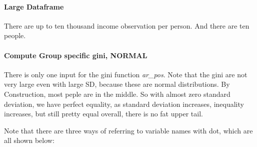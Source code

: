 \documentclass[
]{book}
\newenvironment{Shaded}{\begin{snugshade}}{\end{snugshade}}
\newcommand{\CommentTok}[1]{\textcolor[rgb]{0.56,0.35,0.01}{\textit{#1}}}
\newcommand{\DataTypeTok}[1]{\textcolor[rgb]{0.13,0.29,0.53}{#1}}
\newcommand{\DecValTok}[1]{\textcolor[rgb]{0.00,0.00,0.81}{#1}}
\newcommand{\FloatTok}[1]{\textcolor[rgb]{0.00,0.00,0.81}{#1}}
\newcommand{\KeywordTok}[1]{\textcolor[rgb]{0.13,0.29,0.53}{\textbf{#1}}}
\newcommand{\NormalTok}[1]{#1}
\newcommand{\OperatorTok}[1]{\textcolor[rgb]{0.81,0.36,0.00}{\textbf{#1}}}
\newcommand{\OtherTok}[1]{\textcolor[rgb]{0.56,0.35,0.01}{#1}}
\newcommand{\StringTok}[1]{\textcolor[rgb]{0.31,0.60,0.02}{#1}}
\begin{document}
\hypertarget{large-dataframe}{%
\paragraph{Large Dataframe}\label{large-dataframe}}

There are up to ten thousand income observation per person. And there are ten people.

\begin{Shaded}
\end{Shaded}

\hypertarget{compute-group-specific-gini-normal}{%
\paragraph{Compute Group specific gini, NORMAL}\label{compute-group-specific-gini-normal}}

There is only one input for the gini function \emph{ar\_pos}. Note that the gini are not very large even with large SD, because these are normal distributions. By Construction, most peple are in the middle. So with almost zero standard deviation, we have perfect equality, as standard deviation increases, inequality increases, but still pretty equal overall, there is no fat upper tail.

Note that there are three ways of referring to variable names with dot, which are all shown below:
\end{document}
